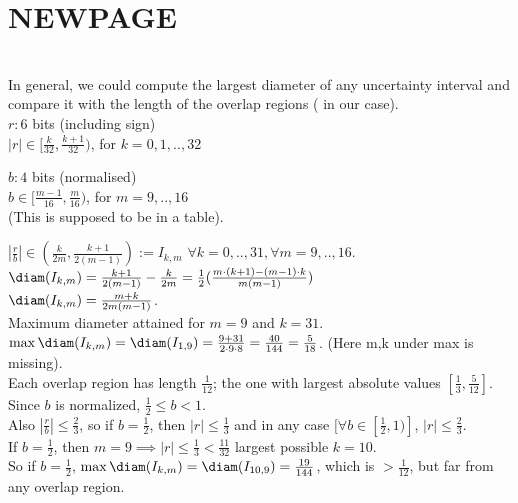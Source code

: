 \section*{NEWPAGE}\\
In general, we could compute the largest diameter of any uncertainty interval and compare it with the length of the overlap regions ( in our case). \\

$r: 6$ bits (including sign) \\
$|r|\in [\frac{k}{32},\frac{k+1}{32})$, for $k=0,1,..,32$ \smallskip

$b: 4$ bits (normalised) \\
$b\in [\frac{m-1}{16},\frac{m}{16})$, for $m=9,..,16$ \\
(This is supposed to be in a table).

$|\frac{r}{b}|\in (\frac{k}{2m},\frac{k+1}{2(m-1)}):=I_{k,m}$ $\forall k=0,..,31, \forall m=9,..,16$. \\

$\diam(I_{k,m})=\frac{k+1}{2(m-1)}-\frac{k}{2m}=\frac{1}{2}(\frac{m\cdot (k+1)-(m-1)\cdot k}{m(m-1)})$ \\
\implies $\diam (I_{k,m})=\frac{m+k}{2m(m-1)}$. \\

Maximum diameter attained for $m=9$ and $k=31$. \\

$\max \diam(I_{k,m})=\diam(I_{1,9})=\frac{9+31}{2\cdot 9\cdot 8}=\frac{40}{144}=\frac{5}{18}$.  (Here m,k under max is missing). \\

Each overlap region has length $\frac{1}{12}$; the one with largest absolute values $[\frac{1}{3},\frac{5}{12}]$. \\

Since $b$ is normalized, $\frac{1}{2}\le b<1$. \\
Also $|\frac{r}{b}|\le \frac{2}{3}$, so if $b=\frac{1}{2}$, then $|r|\le \frac{1}{3}$ and in any case $[\forall b\in [\frac{1}{2},1)]$, $|r|\le \frac{2}{3}$. \\

If $b=\frac{1}{2}$, then $m=9 \implies |r|\le \frac{1}{3}<\frac{11}{32}$ \implies largest possible $k=10$. \\

So if $b=\frac{1}{2}$, $\max \diam (I_{k,m})=\diam(I_{10,9})=\frac{19}{144}$, which is $>\frac{1}{12}$, but far from any overlap region.  \\

